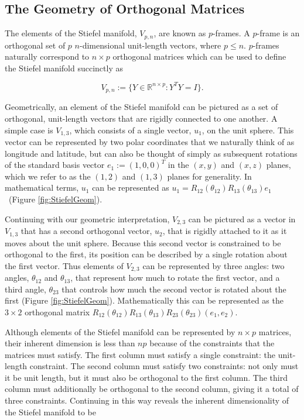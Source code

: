 \documentclass[ba]{imsart}
\numberwithin{equation}{section}
\theoremstyle{plain}
\begin{document}
\subsection{The Geometry of Orthogonal Matrices}\label{givens_stiefel_geometry}
The elements of the Stiefel manifold, $V_{p,n}$,  are known as $p$-frames. A $p$-frame is an orthogonal set of $p$ $n$-dimensional unit-length vectors, where $p \le n$. $p$-frames naturally correspond to $n \times p$ orthogonal matrices which can be used to define the Stiefel manifold succinctly as

\begin{equation}
V_{p,n} := \{Y \in \mathbb{R}^{n \times p}: Y^TY = I \}.
\end{equation}

\noindent Geometrically, an element of the Stiefel manifold can be pictured as a set of orthogonal, unit-length vectors that are rigidly connected to one another. A simple case is $V_{1,3}$, which consists of a single vector, $u_1$, on the unit sphere. This vector can be represented by two polar coordinates that we naturally think of as longitude and latitude, but can also be thought of simply as subsequent rotations of the standard basis vector $e_1 := (1,0,0)^T$ in the $(x,y)$ and $(x,z)$ planes, which we refer to as the $(1,2)$ and $(1,3)$ planes for generality. In mathematical terms, $u_1$ can be represented as $u_1 = R_{12}(\theta_{12}) R_{13}(\theta_{13}) e_1$~(Figure \ref{fig:StiefelGeom}). 

\noindent Continuing with our geometric interpretation, $V_{2,3}$ can be pictured as a vector in $V_{1,3}$ that has a second orthogonal vector, $u_2$, that is rigidly attached to it as it moves about the unit sphere. Because this second vector is constrained to be orthogonal to the first, its position can be described by a single rotation about the first vector. Thus elements of $V_{2,3}$ can be represented by three angles: two angles, $\theta_{12}$ and $\theta_{13}$, that represent how much to rotate the first vector, and a third angle, $\theta_{23}$ that controls how much the second vector is rotated about the first (Figure \ref{fig:StiefelGeom}). Mathematically this can be represented as the $3 \times 2$ orthogonal matrix $R_{12}(\theta_{12}) R_{13}(\theta_{13}) R_{23}(\theta_{23}) (e_1, e_2)$.

\noindent Although elements of the Stiefel manifold can be represented by $n \times p$ matrices, their inherent dimension is less than $np$ because of the constraints that the matrices must satisfy. The first column must satisfy a single constraint: the unit-length constraint. The second column must satisfy two constraints: not only must it be unit length, but it must also be orthogonal to the first column. The third column must additionally be orthogonal to the second column, giving it a total of three constraints. Continuing in this way reveals the inherent dimensionality of the Stiefel manifold to be
\end{document}

